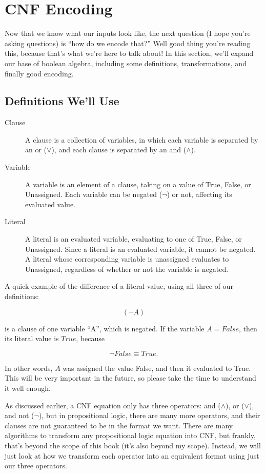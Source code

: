 \section{CNF Encoding}

Now that we know what our inputs look like, the next question (I hope you're
asking questions) is ``how do we encode that?'' Well good thing you're reading
this, because that's what we're here to talk about! In this section, we'll expand
our base of boolean algebra, including some definitions, transformations, and
finally good encoding.

\subsection*{Definitions We'll Use}

\begin{description}
    \item[Clause] A clause is a collection of variables, in which each variable is
    separated by an or ($\lor$), and each clause is separated by an and
    ($\land$).

    \item[Variable] A variable is an element of a clause, taking on a value of
    True, False, or Unassigned. Each variable can be negated ($\neg$) or not,
    affecting its evaluated value.

    \item[Literal] A literal is an evaluated variable, evaluating to one of True,
    False, or Unassigned. Since a literal is an evaluated variable, it cannot be
    negated. A literal whose corresponding variable is unassigned evaluates to
    Unassigned, regardless of whether or not the variable is negated.
\end{description}

A quick example of the difference of a literal value, using all three of our
definitions:

\[
(\neg A)
\]

is a clause of one variable ``A'', which is negated. If the variable
$A=False$, then its literal value is $True$, because

\[
\neg False \equiv True.
\]

In other words, $A$ was assigned the value False, and then it evaluated to
True. This will be very important in the future, so please take the time to
understand it well enough.

As discussed earlier, a CNF equation only has three operators: and ($\land$),
or ($\lor$), and not ($\neg$), but in propositional logic, there are many more
operators, and their clauses are not guaranteed to be in the format we want.
There are many algorithms to transform any propositional logic equation into
CNF, but frankly, that's beyond the scope of this book (it's also beyond my
scope). Instead, we will just look at how we transform each operator into an
equivalent format using just our three operators.


